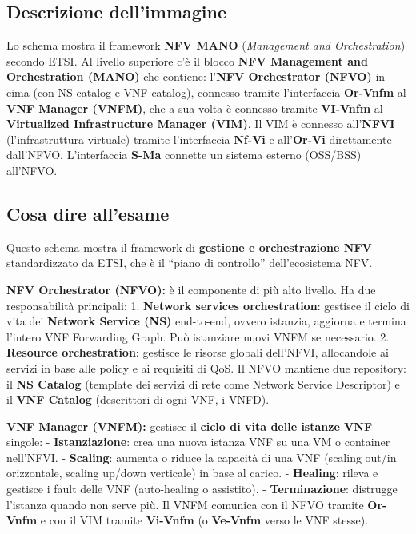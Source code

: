 \documentclass[
  italian,
  openany]{book}
\begin{document}
\subsection{Descrizione
dell'immagine}\label{descrizione-dellimmagine-12}

Lo schema mostra il framework \textbf{NFV MANO} (\emph{Management and
Orchestration}) secondo ETSI. Al livello superiore c'è il blocco
\textbf{NFV Management and Orchestration (MANO)} che contiene:
l'\textbf{NFV Orchestrator (NFVO)} in cima (con NS catalog e VNF
catalog), connesso tramite l'interfaccia \textbf{Or-Vnfm} al \textbf{VNF
Manager (VNFM)}, che a sua volta è connesso tramite \textbf{VI-Vnfm} al
\textbf{Virtualized Infrastructure Manager (VIM)}. Il VIM è connesso
all'\textbf{NFVI} (l'infrastruttura virtuale) tramite l'interfaccia
\textbf{Nf-Vi} e all'\textbf{Or-Vi} direttamente dall'NFVO.
L'interfaccia \textbf{S-Ma} connette un sistema esterno (OSS/BSS)
all'NFVO.

\subsection{Cosa dire all'esame}\label{cosa-dire-allesame-12}

Questo schema mostra il framework di \textbf{gestione e orchestrazione
NFV} standardizzato da ETSI, che è il ``piano di controllo''
dell'ecosistema NFV.

\textbf{NFV Orchestrator (NFVO):} è il componente di più alto livello.
Ha due responsabilità principali: 1. \textbf{Network services
orchestration}: gestisce il ciclo di vita dei \textbf{Network Service
(NS)} end-to-end, ovvero istanzia, aggiorna e termina l'intero VNF
Forwarding Graph. Può istanziare nuovi VNFM se necessario. 2.
\textbf{Resource orchestration}: gestisce le risorse globali dell'NFVI,
allocandole ai servizi in base alle policy e ai requisiti di QoS. Il
NFVO mantiene due repository: il \textbf{NS Catalog} (template dei
servizi di rete come Network Service Descriptor) e il \textbf{VNF
Catalog} (descrittori di ogni VNF, i VNFD).

\textbf{VNF Manager (VNFM):} gestisce il \textbf{ciclo di vita delle
istanze VNF} singole: - \textbf{Istanziazione}: crea una nuova istanza
VNF su una VM o container nell'NFVI. - \textbf{Scaling}: aumenta o
riduce la capacità di una VNF (scaling out/in orizzontale, scaling
up/down verticale) in base al carico. - \textbf{Healing}: rileva e
gestisce i fault delle VNF (auto-healing o assistito). -
\textbf{Terminazione}: distrugge l'istanza quando non serve più. Il VNFM
comunica con il NFVO tramite \textbf{Or-Vnfm} e con il VIM tramite
\textbf{Vi-Vnfm} (o \textbf{Ve-Vnfm} verso le VNF stesse).
\end{document}
